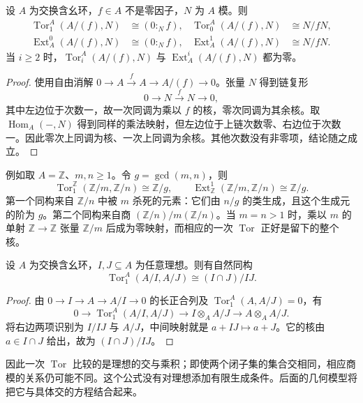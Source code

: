 \begin{proposition}\label{g5:prop:principal-quotient-ext-tor}
	设 \(A\) 为交换含幺环，\(f\in A\) 不是零因子，\(N\) 为 \(A\) 模。则
	\[
		\begin{aligned}
			\operatorname{Tor}_1^A(A/(f),N)&\cong(0:_N f),&
			\operatorname{Tor}_0^A(A/(f),N)&\cong N/fN,\\
			\operatorname{Ext}^0_A(A/(f),N)&\cong(0:_N f),&
			\operatorname{Ext}^1_A(A/(f),N)&\cong N/fN.
		\end{aligned}
	\]
	当 \(i\geq2\) 时，\(\operatorname{Tor}_i^A(A/(f),N)\) 与
	\(\operatorname{Ext}^i_A(A/(f),N)\) 都为零。
\end{proposition}
\begin{proof}
	使用自由消解 \(0\to A\xrightarrow{f}A\to A/(f)\to0\)。张量 \(N\) 得到链复形
	\[
		0\longrightarrow N\xrightarrow{\,f\,}N\longrightarrow0,
	\]
	其中左边位于次数一，故一次同调为乘以 \(f\) 的核，零次同调为其余核。取 \(\operatorname{Hom}_A(-,N)\) 得到同样的乘法映射，但左边位于上链次数零、右边位于次数一。因此零次上同调为核、一次上同调为余核。其他次数没有非零项，结论随之成立。
\end{proof}

例如取 \(A=\mathbb Z\)、\(m,n\geq1\)。令 \(g=\gcd(m,n)\)，则
\[
	\operatorname{Tor}_1^{\mathbb Z}(\mathbb Z/m,\mathbb Z/n)
	\cong\mathbb Z/g,\qquad
	\operatorname{Ext}^1_{\mathbb Z}(\mathbb Z/m,\mathbb Z/n)
	\cong\mathbb Z/g.
\]
第一个同构来自 \(\mathbb Z/n\) 中被 \(m\) 杀死的元素：它们由 \(n/g\) 的类生成，且这个生成元的阶为 \(g\)。第二个同构来自商
\((\mathbb Z/n)/m(\mathbb Z/n)\)。当 \(m=n>1\) 时，乘以 \(m\) 的单射 \(\mathbb Z\to\mathbb Z\) 张量 \(\mathbb Z/m\) 后成为零映射，而相应的一次 \(\operatorname{Tor}\) 正好是留下的整个核。

\begin{proposition}\label{g5:prop:tor-ideal-intersection}
	设 \(A\) 为交换含幺环，\(I,J\subseteq A\) 为任意理想。则有自然同构
	\[
		\operatorname{Tor}_1^A(A/I,A/J)
		\cong (I\cap J)/IJ.
	\]
\end{proposition}
\begin{proof}
	由 \(0\to I\to A\to A/I\to0\) 的长正合列及 \(\operatorname{Tor}_1^A(A,A/J)=0\)，有
	\[
		0\longrightarrow\operatorname{Tor}_1^A(A/I,A/J)
		\longrightarrow I\otimes_A A/J
		\longrightarrow A\otimes_A A/J.
	\]
	将右边两项识别为 \(I/IJ\) 与 \(A/J\)，中间映射就是
	\(a+IJ\mapsto a+J\)。它的核由 \(a\in I\cap J\) 给出，故为 \((I\cap J)/IJ\)。
\end{proof}

因此一次 \(\operatorname{Tor}\) 比较的是理想的交与乘积；即使两个闭子集的集合交相同，相应商模的关系仍可能不同。这个公式没有对理想添加有限生成条件。后面的几何模型将把它与具体交的方程结合起来。


